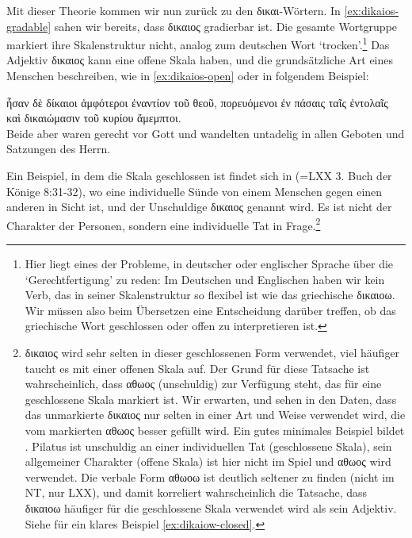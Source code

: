 Mit dieser Theorie kommen wir nun zurück zu den δικαι-Wörtern.
In \ref{ex:dikaios-gradable} sahen wir bereits, dass δικαιος gradierbar ist.
Die gesamte Wortgruppe markiert ihre Skalenstruktur nicht, analog zum deutschen Wort `trocken'.\footnote{
	Hier liegt eines der Probleme, in deutscher oder englischer Sprache über die `Gerechtfertigung' zu reden:
	Im Deutschen und Englischen haben wir kein Verb, das in seiner Skalenstruktur so flexibel ist wie das griechische δικαιοω.
	Wir müssen also beim Übersetzen eine Entscheidung darüber treffen, ob das griechische Wort geschlossen oder offen zu interpretieren ist.
}
Das Adjektiv δικαιος kann eine offene Skala haben, und die grundsätzliche Art eines Menschen beschreiben, wie in \ref{ex:dikaios-open} oder in folgendem Beispiel:
\begin{exe}
	\ex
		{
			ἦσαν δὲ δίκαιοι ἀμφότεροι ἐναντίον τοῦ θεοῦ, πορευόμενοι ἐν πάσαις ταῖς ἐντολαῖς καὶ δικαιώμασιν τοῦ κυρίου ἄμεμπτοι. \\
			Beide aber waren gerecht vor Gott und wandelten untadelig in allen Geboten und Satzungen des Herrn.
		}
\end{exe}
Ein Beispiel, in dem die Skala geschlossen ist findet sich in  (=LXX 3. Buch der Könige 8:31-32),
wo eine individuelle Sünde von einem Menschen gegen einen anderen in Sicht ist, und der Unschuldige δικαιος genannt wird.
Es ist nicht der Charakter der Personen, sondern eine individuelle Tat in Frage.\footnote{
	δικαιος wird sehr selten in dieser geschlossenen Form verwendet, viel häufiger taucht es mit einer offenen Skala auf.
	Der Grund für diese Tatsache ist wahrscheinlich, dass αθωος (unschuldig) zur Verfügung steht, das für eine geschlossene Skala markiert ist.
	Wir erwarten, und sehen in den Daten, dass das unmarkierte δικαιος nur selten in einer Art und Weise verwendet wird, die vom markierten αθωος besser gefüllt wird.
	Ein gutes minimales Beispiel bildet .
	Pilatus ist unschuldig an einer individuellen Tat (geschlossene Skala), sein allgemeiner Charakter (offene Skala) ist hier nicht im Spiel und αθωος wird verwendet.
	Die verbale Form αθωοω ist deutlich seltener zu finden (nicht im NT, nur LXX), und damit korreliert wahrscheinlich die Tatsache, dass δικαιοω häufiger für die
	geschlossene Skala verwendet wird als sein Adjektiv. Siehe für ein klares Beispiel \ref{ex:dikaiow-closed}.
}
